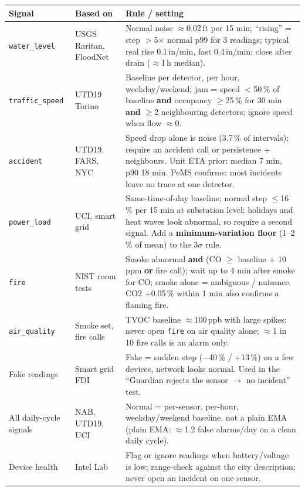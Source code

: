 \documentclass[10pt,a4paper]{article}
\newcommand{\code}[1]{\texttt{#1}}
\begin{document}
{\small
{}
\begin{longtable}{@{}L{2.6cm}L{4.4cm}L{9cm}@{}}
\toprule
\textbf{Signal} & \textbf{Based on} & \textbf{Rule / setting}\\
\midrule
\endhead
\code{water\_level} & USGS Raritan, FloodNet & Normal noise $\approx$0.02\,ft per 15 min; ``rising'' = step $>$5$\times$ normal p99 for 3 readings; typical real rise 0.1\,in/min, fast 0.4\,in/min; close after drain ($\approx$1\,h median).\\
\code{traffic\_speed} & UTD19 Torino & Baseline per detector, per hour, weekday/weekend; jam = speed $<$50\,\% of baseline \textbf{and} occupancy $\geq$25\,\% for 30 min \textbf{and} $\geq$2 neighbouring detectors; ignore speed when flow $\approx$0.\\
\code{accident} & UTD19, FARS, NYC & Speed drop alone is noise (3.7\,\% of intervals); require an accident call or persistence + neighbours. Unit ETA prior: median 7 min, p90 18 min. PeMS confirms: most incidents leave no trace at one detector.\\
\code{power\_load} & UCI, smart grid & Same-time-of-day baseline; normal step $\leq$16\,\% per 15 min at substation level; holidays and heat waves look abnormal, so require a second signal. Add a \textbf{minimum-variation floor} (1--2\,\% of mean) to the 3$\sigma$ rule.\\
\code{fire} & NIST room tests & Smoke abnormal \textbf{and} (CO $\geq$ baseline + 10\,ppm \textbf{or} fire call); wait up to 4 min after smoke for CO; smoke alone = ambiguous / nuisance. CO2 +0.05\,\% within 1 min also confirms a flaming fire.\\
\code{air\_quality} & Smoke set, fire calls & TVOC baseline $\approx$100\,ppb with large spikes; never open \code{fire} on air quality alone; $\approx$1 in 10 fire calls is an alarm only.\\
Fake readings & Smart grid FDI & Fake = sudden step ($-$40\,\% / +13\,\%) on a few devices, network looks normal. Used in the ``Guardian rejects the sensor $\rightarrow$ no incident'' test.\\
All daily-cycle signals & NAB, UTD19, UCI & Normal = per-sensor, per-hour, weekday/weekend baseline, not a plain EMA (plain EMA: $\approx$1.2 false alarms/day on a clean daily cycle).\\
Device health & Intel Lab & Flag or ignore readings when battery/voltage is low; range-check against the city description; never open an incident on one sensor.\\

\end{longtable}}
\end{document}
